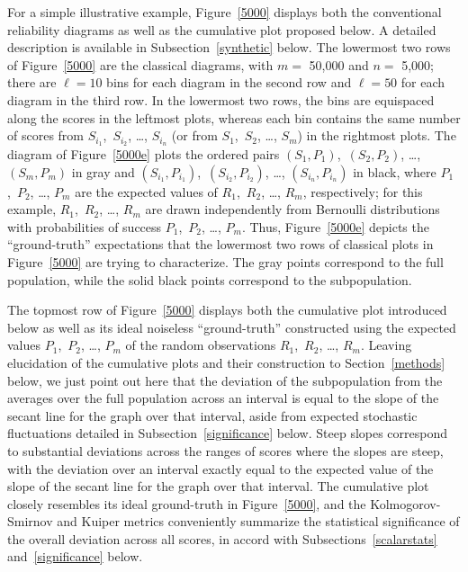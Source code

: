 \documentclass{article}
\begin{document}
For a simple illustrative example,
Figure~\ref{5000} displays both the conventional reliability diagrams
as well as the cumulative plot proposed below.
A detailed description is available in Subsection~\ref{synthetic} below.
The lowermost two rows of Figure~\ref{5000} are the classical diagrams,
with $m =$ 50,000 and $n =$ 5,000;
there are $\ell = 10$ bins for each diagram in the second row
and $\ell = 50$ for each diagram in the third row.
In the lowermost two rows, the bins are equispaced along the scores
in the leftmost plots, whereas each bin contains the same number of scores
from $S_{i_1}$,~$S_{i_2}$, \dots, $S_{i_n}$
(or from $S_1$,~$S_2$, \dots, $S_m$) in the rightmost plots.
The diagram of Figure~\ref{5000e} plots the ordered pairs
$(S_1, P_1)$,~$(S_2, P_2)$, \dots, $(S_m, P_m)$ in gray and
$(S_{i_1}, P_{i_1})$,~$(S_{i_2}, P_{i_2})$, \dots, $(S_{i_n}, P_{i_n})$
in black, where $P_1$,~$P_2$, \dots, $P_m$ are the expected values
of $R_1$,~$R_2$, \dots, $R_m$, respectively;
for this example, $R_1$,~$R_2$, \dots, $R_m$ are drawn independently
from Bernoulli distributions with probabilities of success
$P_1$,~$P_2$, \dots, $P_m$.
Thus, Figure~\ref{5000e} depicts the ``ground-truth'' expectations
that the lowermost two rows of classical plots in Figure~\ref{5000}
are trying to characterize.
The gray points correspond to the full population,
while the solid black points correspond to the subpopulation.

The topmost row of Figure~\ref{5000} displays both
the cumulative plot introduced below as well as its ideal noiseless
``ground-truth'' constructed using the expected values
$P_1$,~$P_2$, \dots, $P_m$ of the random observations
$R_1$,~$R_2$, \dots, $R_m$.
Leaving elucidation of the cumulative plots and their construction
to Section~\ref{methods} below,
we just point out here that the deviation of the subpopulation
from the averages over the full population across an interval
is equal to the slope of the secant line for the graph over that interval,
aside from expected stochastic fluctuations
detailed in Subsection~\ref{significance} below.
Steep slopes correspond to substantial deviations across the ranges of scores
where the slopes are steep, with the deviation over an interval exactly equal
to the expected value of the slope of the secant line for the graph
over that interval. The cumulative plot closely resembles
its ideal ground-truth in Figure~\ref{5000},
and the Kolmogorov-Smirnov and Kuiper metrics conveniently summarize
the statistical significance of the overall deviation across all scores,
in accord with Subsections~\ref{scalarstats} and~\ref{significance} below.
\end{document}
